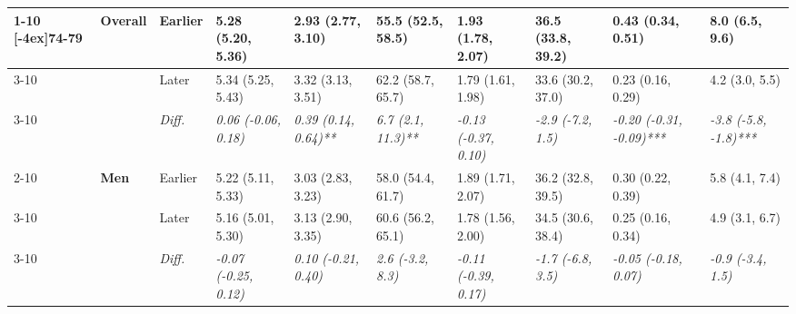 \documentclass[12pt, a4paper]{article}
\begin{document}
\begin{appendices}
\begin{table}[!p]
{\begin{tabular}[t]{>{}l>{}lllllllll}
        \cmidrule{1-10}
        \multirow{9}{*}[-4ex]{\textbf{74-79}} & \multirow{3}{*}{\textbf{Overall}} & Earlier                       & 5.28 (5.20, 5.36)                           & 2.93 (2.77, 3.10)                            & 55.5 (52.5, 58.5)                           & 1.93 (1.78, 2.07)                           & 36.5 (33.8, 39.2)                          & 0.43 (0.34, 0.51)                               & 8.0 (6.5, 9.6)                                \\
        \cmidrule{3-10}
                                              &                                   & Later                         & 5.34 (5.25, 5.43)                           & 3.32 (3.13, 3.51)                            & 62.2 (58.7, 65.7)                           & 1.79 (1.61, 1.98)                           & 33.6 (30.2, 37.0)                          & 0.23 (0.16, 0.29)                               & 4.2 (3.0, 5.5)                                \\
        \cmidrule{3-10}
                                              &                                   & \cellcolor{gray!10}\em{Diff.} & \cellcolor{gray!10}\em{0.06 (-0.06, 0.18)}  & \cellcolor{gray!10}\em{0.39 (0.14, 0.64)**}  & \cellcolor{gray!10}\em{6.7 (2.1, 11.3)**}   & \cellcolor{gray!10}\em{-0.13 (-0.37, 0.10)} & \cellcolor{gray!10}\em{-2.9 (-7.2, 1.5)}   & \cellcolor{gray!10}\em{-0.20 (-0.31, -0.09)***} & \cellcolor{gray!10}\em{-3.8 (-5.8, -1.8)***}  \\
        \cmidrule{2-10}
                                              & \multirow{3}{*}{\textbf{Men}}     & Earlier                       & 5.22 (5.11, 5.33)                           & 3.03 (2.83, 3.23)                            & 58.0 (54.4, 61.7)                           & 1.89 (1.71, 2.07)                           & 36.2 (32.8, 39.5)                          & 0.30 (0.22, 0.39)                               & 5.8 (4.1, 7.4)                                \\
        \cmidrule{3-10}
                                              &                                   & Later                         & 5.16 (5.01, 5.30)                           & 3.13 (2.90, 3.35)                            & 60.6 (56.2, 65.1)                           & 1.78 (1.56, 2.00)                           & 34.5 (30.6, 38.4)                          & 0.25 (0.16, 0.34)                               & 4.9 (3.1, 6.7)                                \\
        \cmidrule{3-10}
                                              &                                   & \cellcolor{gray!10}\em{Diff.} & \cellcolor{gray!10}\em{-0.07 (-0.25, 0.12)} & \cellcolor{gray!10}\em{0.10 (-0.21, 0.40)}   & \cellcolor{gray!10}\em{2.6 (-3.2, 8.3)}     & \cellcolor{gray!10}\em{-0.11 (-0.39, 0.17)} & \cellcolor{gray!10}\em{-1.7 (-6.8, 3.5)}   & \cellcolor{gray!10}\em{-0.05 (-0.18, 0.07)}     & \cellcolor{gray!10}\em{-0.9 (-3.4, 1.5)}      \\

\end{tabular}}
\end{table}
\end{appendices}
\end{document}
